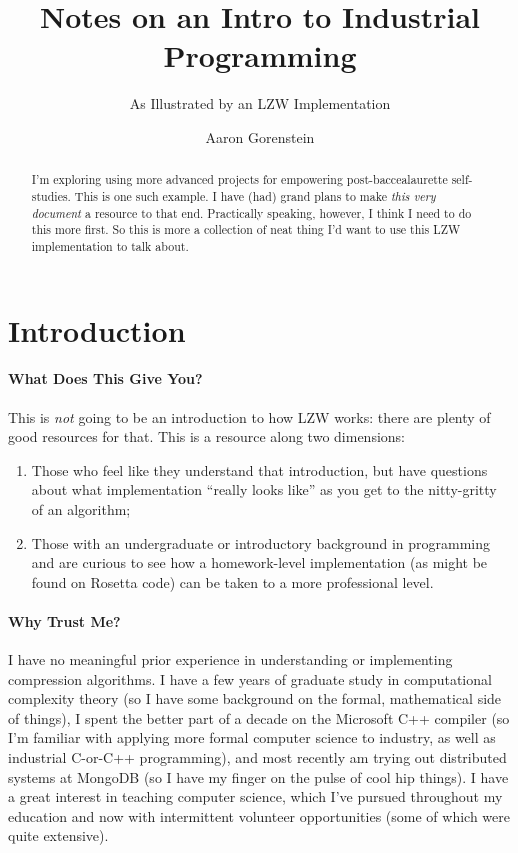 \documentclass{scrartcl}
\author{Aaron Gorenstein}
\title{Notes on an Intro to Industrial Programming}
\subtitle{As Illustrated by an LZW Implementation}
\begin{document}
\maketitle

\begin{abstract}
    I'm exploring using more advanced projects for empowering post-baccealaurette self-studies.
    This is one such example.
    I have (had) grand plans to make \emph{this very document} a resource to that end.
    Practically speaking, however, I think I need to do this more first.
    So this is more a collection of neat thing I'd want to use this LZW implementation to talk about.
\end{abstract}

\tableofcontents

\section{Introduction}
\paragraph{What Does This Give You?}
This is \emph{not} going to be an introduction to how LZW works: there are plenty of good resources for that.
This is a resource along two dimensions:
\begin{enumerate}
    \item Those who feel like they understand that introduction, but have questions about what implementation ``really looks like'' as you get to the nitty-gritty of an algorithm;
    \item Those with an undergraduate or introductory background in programming and are curious to see how a homework-level implementation (as might be found on Rosetta code) can be taken to a more professional level.
\end{enumerate}

\paragraph{Why Trust Me?}
I have no meaningful prior experience in understanding or implementing compression algorithms.
I have a few years of graduate study in computational complexity theory (so I have some background on the formal, mathematical side of things), I spent the better part of a decade on the Microsoft C++ compiler (so I'm familiar with applying more formal computer science to industry, as well as industrial C-or-C++ programming), and most recently am trying out distributed systems at MongoDB (so I have my finger on the pulse of cool hip things).
I have a great interest in teaching computer science, which I've pursued throughout my education and now with intermittent volunteer opportunities (some of which were quite extensive).
\end{document}
